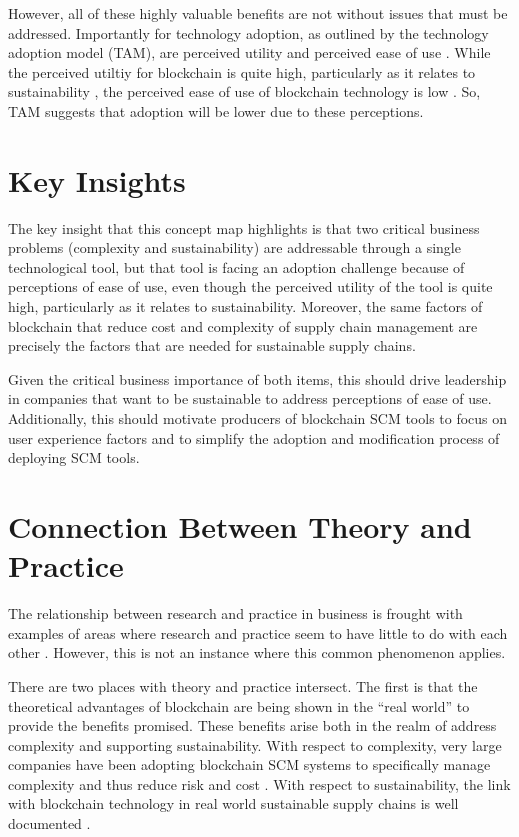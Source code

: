 However, all of these highly valuable benefits are not without issues that must be addressed. Importantly for technology adoption, as outlined by the technology adoption model (TAM), are perceived utility and perceived ease of use \parencite{parkUserAcceptanceDigital2009, gefenTrustTAMOnline2003}. While the perceived utiltiy for blockchain is quite high, particularly as it relates to sustainability \parencite{kambleUnderstandingBlockchainTechnology2019a, louIntegratingInnovationDiffusion2017}, the perceived ease of use of blockchain technology is low \parencite{kambleUnderstandingBlockchainTechnology2019a, yangMaritimeShippingDigitalization2019}. So, TAM suggests that adoption will be lower due to these perceptions.


\section{Key Insights}

The key insight that this concept map highlights is that two critical business problems (complexity and sustainability) are addressable through a single technological tool, but that tool is facing an adoption challenge because of perceptions of ease of use, even though the perceived utility of the tool is quite high, particularly as it relates to sustainability. Moreover, the same factors of blockchain that reduce cost and complexity of supply chain management are precisely the factors that are needed for sustainable supply chains.

Given the critical business importance of both items, this should drive leadership in companies that want to be sustainable to address perceptions of ease of use. Additionally, this should motivate producers of blockchain SCM tools to focus on user experience factors and to simplify the adoption and modification process of deploying SCM tools.

\section{Connection Between Theory and Practice}

The relationship between research and practice in business is frought with examples of areas where research and practice seem to have little to do with each other \parencite{brettleAreWeBridging2012, bansalBridgingResearchPracticeGap2012}. However, this is not an instance where this common phenomenon applies.

There are two places with theory and practice intersect. The first is that the theoretical advantages of blockchain are being shown in the ``real world'' to provide the benefits promised. These benefits arise both in the realm of address complexity and supporting sustainability. With respect to complexity, very large companies have been adopting blockchain SCM systems to specifically manage complexity and thus reduce risk and cost \parencite{groenfeldtIBMMaerskApply2017}. With respect to sustainability, the link with blockchain technology in real world sustainable supply chains is well documented \parencite{saberiBlockchainTechnologyIts2019, teixeiraHowMakeStrategic2019}.

